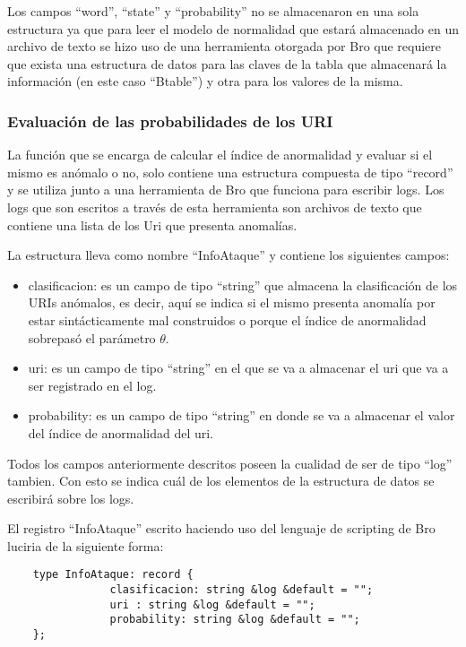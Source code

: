 Los campos “word”, “state” y “probability” no se almacenaron en una sola estructura ya que para leer el modelo de normalidad que estará almacenado en un archivo de texto se hizo uso de una herramienta otorgada por Bro que requiere que exista una estructura de datos  para las claves de la tabla que almacenará la información (en este caso “Btable”) y otra para los valores de la misma.

\subsubsection{Evaluación de las probabilidades de los URI}
La función  que se encarga de calcular el índice de anormalidad  y evaluar si el mismo es anómalo o no, solo contiene una estructura compuesta de tipo “record” y se utiliza junto a una herramienta de Bro que funciona para escribir logs. Los logs que son escritos a través de esta herramienta son archivos de texto que contiene una lista de los Uri que presenta anomalías.

La estructura lleva como nombre “InfoAtaque” y contiene los siguientes campos:

\begin{itemize}
\item clasificacion: es un campo de tipo “string” que almacena la clasificación de los URIs anómalos, es decir, aquí se indica si el mismo presenta anomalía por estar sintácticamente mal construidos o porque el índice de anormalidad sobrepasó el parámetro $\theta$.
\item uri: es un campo de tipo “string” en el que se va a almacenar el uri que va a ser registrado en el log.
\item probability: es un campo de tipo “string” en donde se va a almacenar el valor del índice de anormalidad del uri.
\end{itemize}

Todos los campos anteriormente descritos poseen la cualidad de ser de tipo “log” tambien. Con esto se indica cuál de los elementos de la estructura de datos se escribirá sobre los logs.

    El registro “InfoAtaque” escrito haciendo uso del lenguaje de scripting de Bro luciria de la siguiente forma:

\begin{verbatim}
    type InfoAtaque: record {
                clasificacion: string &log &default = "";
                uri : string &log &default = "";
                probability: string &log &default = "";
    }; 
\end{verbatim}

